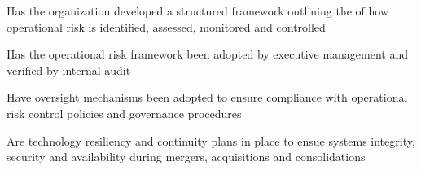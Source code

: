 %
%



\begin{maturity-dimensions}

  \item Has the organization developed a structured framework outlining the  of how
        operational risk is identified, assessed, monitored and controlled
  \item Has the operational risk framework been adopted by executive management and verified by
        internal audit
  \item Have oversight mechanisms been adopted to ensure compliance with operational risk
        control policies and governance procedures
  \item Are technology resiliency and continuity plans in place to ensue systems integrity,
        security and availability during mergers, acquisitions and consolidations

\end{maturity-dimensions}

